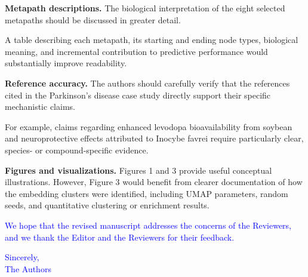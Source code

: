 \documentclass[11pt,american]{article}
\begin{document}
\begin{revcomment}
\textbf{Metapath descriptions.} The biological interpretation of the eight selected metapaths should be discussed in greater detail.

A table describing each metapath, its starting and ending node types, biological meaning, and incremental contribution to predictive performance would substantially improve readability.
\end{revcomment}

\begin{revresponse}

\end{revresponse}

\begin{revcomment}
\textbf{Reference accuracy.} The authors should carefully verify that the references cited in the Parkinson's disease case study directly support their specific mechanistic claims.

For example, claims regarding enhanced levodopa bioavailability from soybean and neuroprotective effects attributed to Inocybe favrei require particularly clear, species- or compound-specific evidence.
\end{revcomment}

\begin{revresponse}

\end{revresponse}

\begin{revcomment}
\textbf{Figures and visualizations.} Figures 1 and 3 provide useful conceptual illustrations. However, Figure 3 would benefit from clearer documentation of how the embedding clusters were identified, including UMAP parameters, random seeds, and quantitative clustering or enrichment results.
\end{revcomment}

\begin{revresponse}

\end{revresponse}

\vspace{2em}
\textcolor{blue}{We hope that the revised manuscript addresses the concerns of the Reviewers, and we thank the Editor and the Reviewers for their feedback.}

\textcolor{blue}{Sincerely, \\ The Authors}

% 
% 
\end{document}
